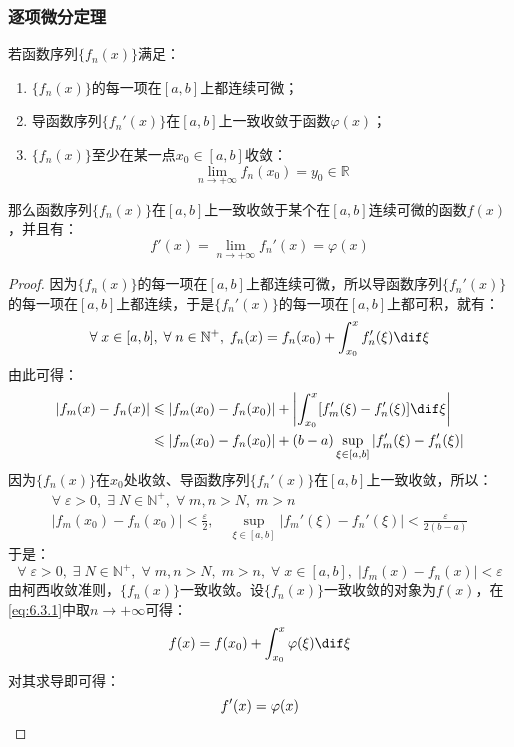 \subsubsection{逐项微分定理}
\begin{theorem}
	若函数序列$\{f_n(x)\}$满足：
	\begin{enumerate}
		\item $\{f_n(x)\}$的每一项在$[a,b]$上都连续可微；
		\item 导函数序列$\{f_n'(x)\}$在$[a,b]$上一致收敛于函数$\varphi(x)$；
		\item $\{f_n(x)\}$至少在某一点$x_0\in[a,b]$收敛：
		\begin{equation*}
			\lim_{n\to+\infty}f_n(x_0)=y_0\in\mathbb{R}
		\end{equation*}
	\end{enumerate}
	那么函数序列$\{f_n(x)\}$在$[a,b]$上一致收敛于某个在$[a,b]$连续可微的函数$f(x)$，并且有：
	\begin{equation*}
		f'(x)=\lim_{n\to+\infty}f_n'(x)=\varphi(x)
	\end{equation*}
\end{theorem}
\begin{proof}
	因为$\{f_n(x)\}$的每一项在$[a,b]$上都连续可微，所以导函数序列$\{f_n'(x)\}$的每一项在$[a,b]$上都连续，于是$\{f_n'(x)\}$的每一项在$[a,b]$上都可积，就有：
	\begin{equation}\label{eq:6.3.1}
		\forall\;x\in[a,b],\;\forall\;n\in\mathbb{N}^+,\;f_n(x)=f_n(x_0)+\int_{x_0}^{x}f_n'(\xi)\dif\xi
	\end{equation}
	由此可得：
	\begin{align*}
		|f_m(x)-f_n(x)|
		&\leqslant|f_m(x_0)-f_n(x_0)|+\left|\int_{x_0}^{x}[f_m'(\xi)-f_n'(\xi)]\dif\xi\right| \\
		&\leqslant|f_m(x_0)-f_n(x_0)|+(b-a)\sup_{\xi\in[a,b]}|f_m'(\xi)-f_n'(\xi)|
	\end{align*}
	因为$\{f_n(x)\}$在$x_0$处收敛、导函数序列$\{f_n'(x)\}$在$[a,b]$上一致收敛，所以：
	\begin{gather*}
		\forall\;\varepsilon>0,\;\exists\;N\in\mathbb{N}^+,\;\forall\;m,n>N,\;m>n \\
		|f_m(x_0)-f_n(x_0)|<\frac{\varepsilon}{2},\quad\sup_{\xi\in[a,b]}|f_m'(\xi)-f_n'(\xi)|<\frac{\varepsilon}{2(b-a)}
	\end{gather*}
	于是：
	\begin{equation*}
		\forall\;\varepsilon>0,\;\exists\;N\in\mathbb{N}^+,\;\forall\;m,n>N,\;m>n,\;\forall\;x\in[a,b],\;|f_m(x)-f_n(x)|<\varepsilon
	\end{equation*}
	由柯西收敛准则，$\{f_n(x)\}$一致收敛。设$\{f_n(x)\}$一致收敛的对象为$f(x)$，在\eqref{eq:6.3.1}中取$n\to+\infty$可得：
	\begin{equation*}
		f(x)=f(x_0)+\int_{x_0}^{x}\varphi(\xi)\dif\xi
	\end{equation*}
	对其求导即可得：
	\begin{equation*}
		f'(x)=\varphi(x)\qedhere
	\end{equation*}
\end{proof}
